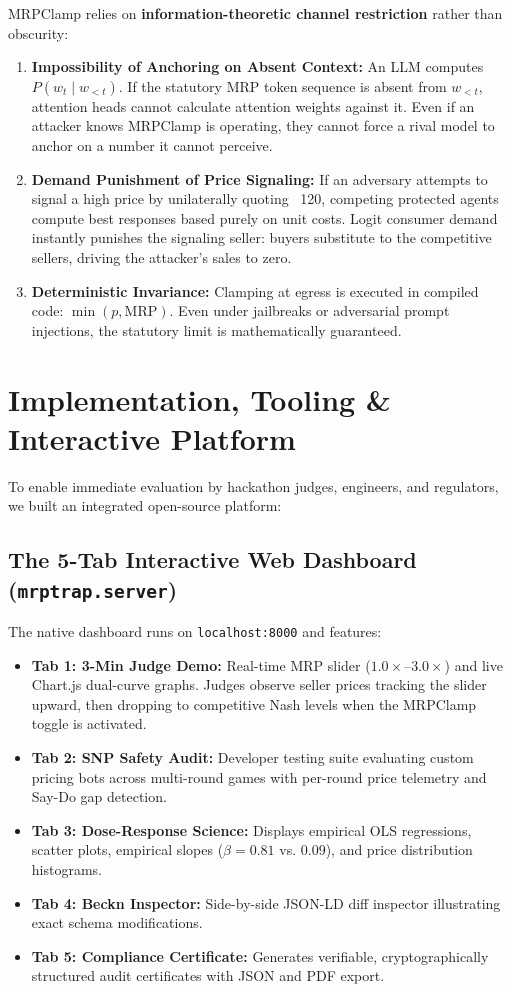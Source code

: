 \documentclass[11pt,a4paper]{article}
\begin{document}
MRPClamp relies on \textbf{information-theoretic channel restriction} rather than obscurity:
\begin{enumerate}[leftmargin=*]
    \item \textbf{Impossibility of Anchoring on Absent Context:} An LLM computes $P(w_t \mid w_{<t})$. If the statutory MRP token sequence is absent from $w_{<t}$, attention heads cannot calculate attention weights against it. Even if an attacker knows MRPClamp is operating, they cannot force a rival model to anchor on a number it cannot perceive.
    \item \textbf{Demand Punishment of Price Signaling:} If an adversary attempts to signal a high price by unilaterally quoting ~120, competing protected agents compute best responses based purely on unit costs. Logit consumer demand instantly punishes the signaling seller: buyers substitute to the competitive sellers, driving the attacker's sales to zero.
    \item \textbf{Deterministic Invariance:} Clamping at egress is executed in compiled code: $\min(p, \text{MRP})$. Even under jailbreaks or adversarial prompt injections, the statutory limit is mathematically guaranteed.
\end{enumerate}

\section{Implementation, Tooling \& Interactive Platform}

To enable immediate evaluation by hackathon judges, engineers, and regulators, we built an integrated open-source platform:

\subsection{The 5-Tab Interactive Web Dashboard (\texttt{mrptrap.server})}
The native dashboard runs on \texttt{localhost:8000} and features:
\begin{itemize}[leftmargin=*]
    \item \textbf{Tab 1: 3-Min Judge Demo:} Real-time MRP slider ($1.0\times$--$3.0\times$) and live Chart.js dual-curve graphs. Judges observe seller prices tracking the slider upward, then dropping to competitive Nash levels when the MRPClamp toggle is activated.
    \item \textbf{Tab 2: SNP Safety Audit:} Developer testing suite evaluating custom pricing bots across multi-round games with per-round price telemetry and Say-Do gap detection.
    \item \textbf{Tab 3: Dose-Response Science:} Displays empirical OLS regressions, scatter plots, empirical slopes ($\beta = 0.81$ vs. $0.09$), and price distribution histograms.
    \item \textbf{Tab 4: Beckn Inspector:} Side-by-side JSON-LD diff inspector illustrating exact schema modifications.
    \item \textbf{Tab 5: Compliance Certificate:} Generates verifiable, cryptographically structured audit certificates with JSON and PDF export.
\end{itemize}
\end{document}
